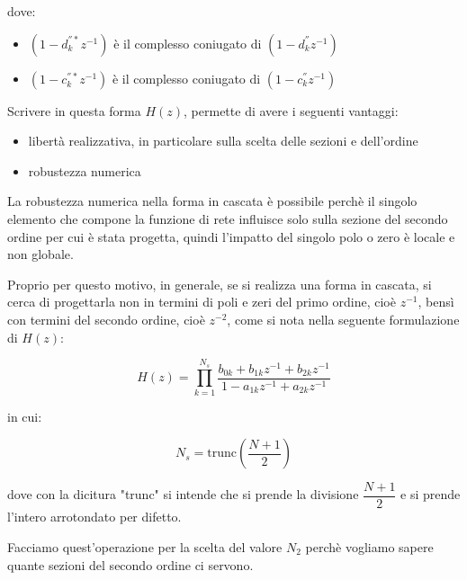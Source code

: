 dove: 

\begin{itemize}
    \item $ \left(1 - d_{k}^{''*} z^{-1}\right)$ è il complesso coniugato di $\left(1 - d_{k}^{''} z^{-1}\right)$ 
    \item $\left(1 - c_{k}^{''*} z^{-1}\right)$ è il complesso coniugato di $\left(1 - c_{k}^{''} z^{-1}\right)$
\end{itemize}

Scrivere in questa forma $H \left(z\right)$, permette di avere i seguenti vantaggi: 

\begin{itemize}
    \item libertà realizzativa, in particolare sulla scelta delle sezioni e dell'ordine 
    \item robustezza numerica 
\end{itemize}

La robustezza numerica nella forma in cascata è possibile perchè il singolo elemento che compone la funzione di rete influisce solo sulla sezione del secondo ordine per cui è stata progetta, 
quindi l'impatto del singolo polo o  zero è locale e non globale. \newline 

Proprio per questo motivo, in generale, se si realizza una forma in cascata, si cerca di progettarla non in  termini di poli e zeri del primo ordine, cioè $z^{-1}$, 
bensì con termini del secondo ordine, cioè $z^{-2}$, come si nota nella seguente formulazione di $H \left(z\right)$: 

{
    \Large 
    \begin{equation}
        H \left(z\right) 
        = 
        \prod_{k = 1}^{N_s} 
        \dfrac{
            b_{0k} + b_{1k} z^{-1} + b_{2k} z^{-1}
        }{
            1 - a_{1k} z^{-1} + a_{2k} z^{-1}
        }
    \end{equation}
}

in cui: 

{
    \Large 
    \begin{equation}
        N_s = \text{trunc} \left(\dfrac{N + 1}{2}\right)
    \end{equation}
} 

dove con la dicitura "trunc" si intende che si prende la divisione $\dfrac{N + 1}{2}$ e si prende l'intero arrotondato per difetto. \newline 

Facciamo quest'operazione per la scelta del valore $N_2$ perchè vogliamo sapere quante sezioni del secondo ordine ci servono. \newline 

